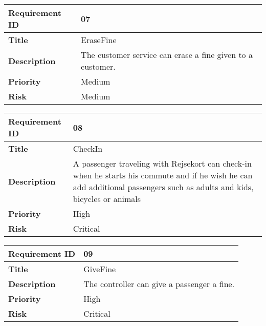 \begin{center}
	\def\arraystretch{1.5}%
    \begin{tabular}{ | p{5cm} | p{5cm} |}
    \hline
    	\textbf{Requirement ID} & 07 \\ \hline
		\textbf{Title} & EraseFine\\ \hline
		\textbf{Description} & The customer service can erase a fine given to a customer.\\ \hline
		\textbf{Priority} & Medium\\ \hline
		\textbf{Risk} & Medium\\
      \hline
    \end{tabular}
\end{center}

\begin{center}
	\def\arraystretch{1.5}%
    \begin{tabular}{ | p{5cm} | p{5cm} |}
    \hline
    	\textbf{Requirement ID} & 08 \\ \hline
		\textbf{Title} & CheckIn\\ \hline
		\textbf{Description} & A passenger traveling with Rejsekort can check-in when he starts his commute and if he wish he can add additional passengers such as adults and kids, bicycles or animals\\ \hline
		\textbf{Priority} & High\\ \hline
		\textbf{Risk} & Critical\\
      \hline
    \end{tabular}
\end{center}

\begin{center}
	\def\arraystretch{1.5}%
    \begin{tabular}{ | p{5cm} | p{5cm} |}
    \hline
    	\textbf{Requirement ID} & 09 \\ \hline
		\textbf{Title} & GiveFine\\ \hline
		\textbf{Description} & The controller can give a passenger a fine.\\ \hline
		\textbf{Priority} & High\\ \hline
		\textbf{Risk} & Critical\\
      \hline
    \end{tabular}
\end{center}

